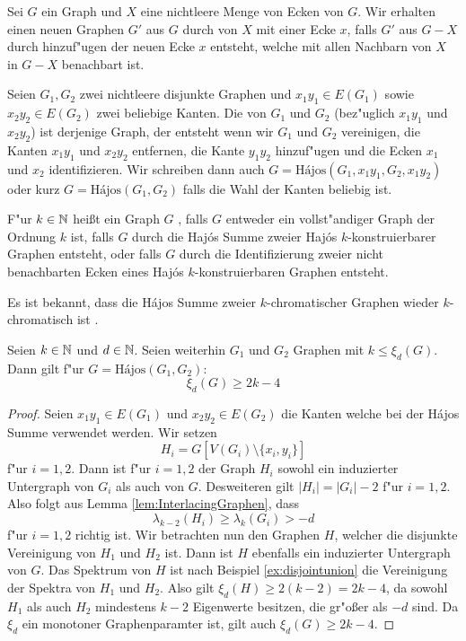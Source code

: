 Sei $G$ ein Graph und $X$ eine nichtleere Menge von Ecken von $G$. Wir erhalten einen neuen Graphen $G'$ aus $G$ durch   von $X$ mit einer Ecke $x$, falls $G'$ aus $G-X$ durch hinzuf"ugen der neuen Ecke $x$ entsteht, welche mit allen Nachbarn von $X$ in $G-X$ benachbart ist. 

Seien $G_1, G_2$ zwei nichtleere disjunkte Graphen und $x_1y_1\in E(G_1)$ sowie $x_2y_2 \in E(G_2)$ zwei beliebige Kanten. Die  \cite{Hajos61} von $G_1$ und $G_2$ (bez"uglich $x_1y_1$ und $x_2y_2$) ist derjenige Graph, der entsteht wenn wir $G_1$ und $G_2$ vereinigen, die Kanten $x_1y_1$ und $x_2y_2$ entfernen, die Kante $y_1y_2$ hinzuf"ugen und  die Ecken $x_1$ und $x_2$ identifizieren. Wir schreiben dann auch $G= \text{H\'ajos}(G_1,x_1y_1,G_2,x_1y_2)$ oder
kurz $G= \text{H\'ajos}(G_1,G_2)$ falls die Wahl der Kanten beliebig ist.

F"ur $k\in {\mathbb{N}}$ hei{\ss}t ein Graph $G$ , falls $G$ entweder ein vollst"andiger Graph der Ordnung $k$ ist, falls $G$ durch die Haj\'os Summe zweier Haj\'os $k$-konstruierbarer Graphen entsteht, oder falls $G$ durch die Identifizierung zweier nicht benachbarten Ecken eines Haj\'os $k$-konstruierbaren Graphen entsteht. 

Es ist bekannt, dass die H\'ajos Summe zweier $k$-chromatischer Graphen wieder $k$-chromatisch ist . 

\begin{theorem}
  Seien $k\in{\mathbb{N}}$ und $d\in{\mathbb{N}}$. Seien weiterhin $G_1$ und $G_2$ Graphen mit $k\leq \xi_{d}(G)$. Dann gilt f"ur $G= \text{H\'ajos}(G_1,G_2)$:
  $$\xi_{d}(G) \geq 2k-4$$
  \label{thm:hajoseigenwerte}
\end{theorem}

\begin{proof}
  Seien $x_1y_1\in E(G_1)$ und $x_2y_2\in E(G_2)$ die Kanten welche bei der H\'ajos Summe verwendet werden. Wir setzen $$H_i = G[V(G_i)\setminus\{x_i,y_i\}] $$ f"ur $i=1,2$. Dann ist f"ur $i=1,2$ der Graph $H_i$ sowohl ein induzierter Untergraph von $G_i$ als auch von $G$. 
  Desweiteren gilt $|H_i| = |G_i|-2$ f"ur $i=1,2$. Also folgt aus Lemma \ref{lem:InterlacingGraphen}, dass $$\lambda_{k-2}(H_i) \geq \lambda_{k}(G_i) > -d$$ f"ur $i=1,2$ richtig ist. Wir betrachten nun den Graphen $H$, welcher die disjunkte Vereinigung von $H_1$ und $H_2$ ist. Dann ist $H$ ebenfalls ein induzierter Untergraph von $G$. 
  Das Spektrum von $H$ ist nach Beispiel \ref{ex:disjointunion} die Vereinigung der Spektra von $H_1$ und $H_2$. Also gilt $\xi_{d}(H) \geq 2(k-2) = 2k-4$, da sowohl $H_1$ als auch $H_2$ mindestens $k-2$ Eigenwerte besitzen, die gr"o{\ss}er als $-d$ sind. 
  Da $\xi_d$ ein monotoner Graphenparamter ist, gilt auch $\xi_{d}(G) \geq 2k-4$.
\end{proof}


